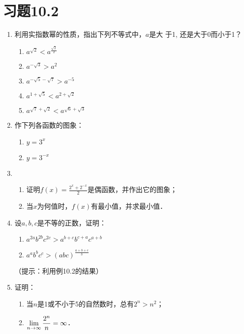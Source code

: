 \section*{习题10.2}
\begin{enumerate}
  \item 利用实指数幂的性质，指出下列不等式中，$a$是大
  于1, 还是大于0而小于1？
\begin{multicols}{2}
  \begin{enumerate}
  \item $a^{\sqrt{2}}<a^{\tfrac{\sqrt{2}}{2}}$
  \item $a^{-\sqrt{3}}>a^2$
  \item $a^{-\sqrt{5}-\sqrt{7}}>a^{-5}$
  \item $a^{1+\sqrt{5}}<a^{2+\sqrt{2}}$
  \item $a^{\sqrt{7}+\sqrt{2}}<a^{\sqrt{6}+\sqrt{3}}$
\end{enumerate}
\end{multicols}

\item 作下列各函数的图象：
\begin{multicols}{2}
  \begin{enumerate}
  \item $y=3^x$
  \item $y=3^{-x}$
\end{enumerate}
\end{multicols}

\item \begin{enumerate}
  \item 证明$f(x)=\frac{2^x+2^{-x}}{2}$是偶函数，并作出它的图象；
  \item 当$x$为何值时，$f(x)$有最小值，并求最小值．
\end{enumerate}

\item 设$a,b,c$是不等的正数，证明：
\begin{enumerate}
  \item $a^{2 a} b^{2 b} c^{2 c}>a^{b+c} b^{c+a} c^{a+b}$
  \item $a^{a} b^{b} c^{c}>(a b c)^{\tfrac{a+b+c}{3}}$
\end{enumerate}
（提示：利用例10.2的结果）

\item 证明：
\begin{enumerate}
  \item 当$n$是1或不小于5的自然数时，总有$2^n>n^2$；
  \item $\displaystyle\lim_{n\to\infty}\dfrac{2^n}{n}=\infty$．
\end{enumerate}
\end{enumerate}

